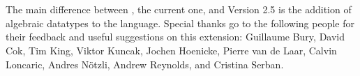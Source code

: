 \section*{\thisversion}

The main difference between \thisversion, the current one, and Version 2.5 is the addition of algebraic datatypes to the language.
Special thanks go to the following people
for their feedback and useful suggestions on this extension:
Guillaume Bury,
David Cok,
Tim King,
Viktor Kuncak,
Jochen Hoenicke,
Pierre van de Laar,
Calvin Loncaric,
Andres Nötzli,
Andrew Reynolds,
and
Cristina Serban.
